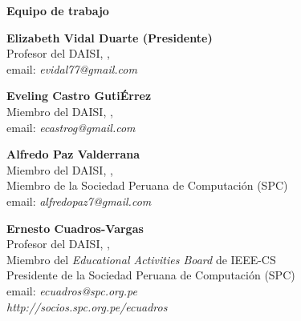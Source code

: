 \begin{center}
{\bf \Huge Equipo de trabajo}
\end{center}
\vspace{1cm}

\begin{center}
\textbf{Elizabeth Vidal Duarte (Presidente)}\\
Profesor del DAISI, \University, \city\\
email: \textit{evidal77@gmail.com}
\end{center}

\begin{center}
\textbf{Eveling Castro GutiÉrrez}\\
Miembro del DAISI, \University, \city\\
email: \textit{ecastrog@gmail.com}
\end{center}

\begin{center}
\textbf{Alfredo Paz Valderrana}\\
Miembro del DAISI, \University, \city\\
Miembro de la Sociedad Peruana de Computación (SPC)\\
email: \textit{alfredopaz7@gmail.com}
\end{center}

\begin{center}
\textbf{Ernesto Cuadros-Vargas}\\
Profesor del DAISI, \University, \city\\
Miembro del \textit{Educational Activities Board} de IEEE-CS\\
Presidente de la Sociedad Peruana de Computación (SPC)\\
email: \textit{ecuadros@spc.org.pe}\\
\textit{http://socios.spc.org.pe/ecuadros}
\end{center}




